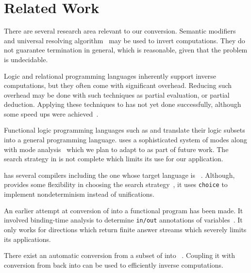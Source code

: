 \section{Related Work}

There are several research area relevant to our conversion.
Semantic modifiers~\cite{abramov2001standard} and universal resolving algorithm~\cite{abramov2002principles} may be used to invert computations.
They do not guarantee termination in general, which is reasonable, given that the problem is undecidable.

Logic and relational programming languages inherently support inverse computations, but they often come with significant overhead.
Reducing such overhead may be done with such techniques as partial evaluation, or partial deduction.
Applying these techniques to \mk has not yet done successfully, although some speed ups were achieved~\cite{EPTCS341.5}.

Functional logic programming languages such as \curry and \mercury translate their logic subsets into a general programming language.
\mercury uses a sophisticated system of modes along with mode analysis~\cite{overton2002constraint} which we plan to adapt to \mk as part of future work.
The search strategy in \mercury is not complete which limits its use for our application.

\curry has several compilers including the one whose target language is \haskell~\cite{brassel2011kics2}.
Although, \curry provides some flexibility in choosing the search strategy~\cite{hanus2012search}, it uses \lstinline{choice} to implement nondeterminism instead of unifications.

An earlier attempt at conversion of \mk into a functional program has been made.
It involved binding-time analysis to determine \lstinline{in/out} annotations of variables~\cite{verbitskaiabinding}.
It only works for directions which return finite answer streams which severely limits its applications.

There exist an automatic conversion from a subset of \ocaml into \ocanren~\cite{lozov2017typed}.
Coupling it with conversion from \mk back into \ocaml can be used to efficiently inverse computations.


